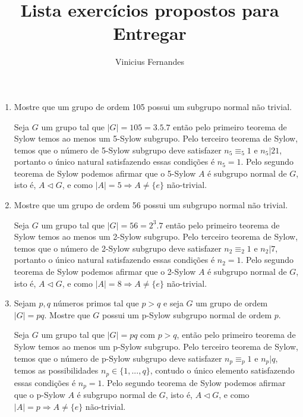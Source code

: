 \documentclass{article}
\begin{document}
	
	\title{Lista exercícios propostos para Entregar}
	\author{Vinicius Fernandes}
	
	\maketitle
	
	\begin{enumerate}
		
		\item Mostre que um grupo de ordem 105 possui um subgrupo normal não trivial.
		
		Seja $G$ um grupo tal que $|G| = 105 = 3.5.7$ então pelo primeiro teorema de Sylow temos ao menos um 5-Sylow subgrupo. Pelo terceiro teorema de Sylow, temos que o número de 5-Sylow subgrupo deve satisfazer $n_{5} \equiv_{5} 1$ e $n_{5} | 21$, portanto o único natural satisfazendo essas condições é $n_{5} = 1$. Pelo segundo teorema de Sylow podemos afirmar que o 5-Sylow $A$ é subgrupo normal de $G$, isto é, $A \vartriangleleft G$, e como $|A| = 5 \Rightarrow A \neq \{e\}$ não-trivial.
		
		\item Mostre que um grupo de ordem 56 possui um subgrupo normal não trivial.
		
		Seja $G$ um grupo tal que $|G| = 56 = 2^{3}.7$ então pelo primeiro teorema de Sylow temos ao menos um 2-Sylow subgrupo. Pelo terceiro teorema de Sylow, temos que o número de 2-Sylow subgrupo deve satisfazer $n_{2} \equiv_{2} 1$ e $n_{2} | 7$, portanto o único natural satisfazendo essas condições é $n_{2} = 1$. Pelo segundo teorema de Sylow podemos afirmar que o 2-Sylow $A$ é subgrupo normal de $G$, isto é, $A \vartriangleleft G$, e como $|A| = 8 \Rightarrow A \neq \{e\}$ não-trivial.
		
		\item Sejam $p,q$ números primos tal que $p>q$ e seja $G$ um grupo de ordem $|G| = pq$. Mostre que $G$ possui um p-Sylow subgrupo normal de ordem $p$.
		
		Seja $G$ um grupo tal que $|G| = pq$ com $p>q$, então pelo primeiro teorema de Sylow temos ao menos um p-Sylow subgrupo. Pelo terceiro teorema de Sylow, temos que o número de p-Sylow subgrupo deve satisfazer $n_{p} \equiv_{p} 1$ e $n_{p} | q$, temos as possibilidades $n_{p} \in \{1,...,q\}$, contudo o único elemento satisfazendo essas condições é $n_{p} = 1$. Pelo segundo teorema de Sylow podemos afirmar que o p-Sylow $A$ é subgrupo normal de $G$, isto é, $A \vartriangleleft G$, e como $|A| = p \Rightarrow A \neq \{e\}$ não-trivial.
		

\end{enumerate}
\end{document}
